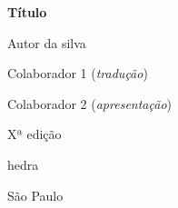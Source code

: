 




\begingroup\thispagestyle{empty}\vspace*{.05\textheight} 

              \formular
              \Huge
              \noindent
              \textbf{Título}

              {\brabo\LARGE
              \noindent Autor da silva}
              
              \vfill

  \newfontfamily{}
              \fontsize{30}{40}\selectfont \minion\small
              \noindent Colaborador 1 (\textit{tradução})
              \vspace{0.1cm}

              \noindent Colaborador 2 (\textit{apresentação})

              \vspace{0.5cm}
              
              {\noindent\fontsize{30}{40}\selectfont \minion\small\noindent Xª edição}

              \vfill

              \newfontfamily{}
              {\noindent\fontsize{30}{40}\selectfont\timesnewroman hedra}
              \smallskip
              
              {\selectfont\minion\small
              \noindent São Paulo \quad\the\year}

\endgroup
\pagebreak
